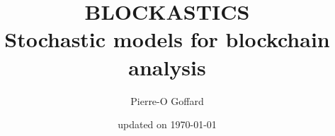\documentclass[a4paper]{report}
\begin{document}
\title{BLOCKASTICS\\
[0.2em]\smaller{}Stochastic models for blockchain analysis}
\author{Pierre-O Goffard}

\date{updated on \today} 
\maketitle

\tableofcontents









\end{document}
